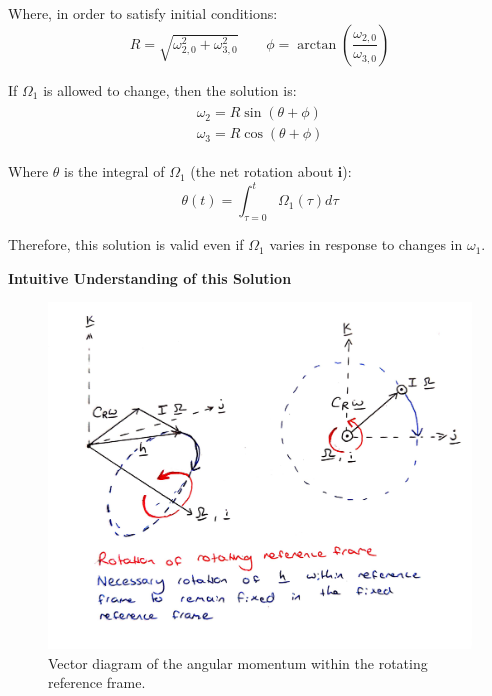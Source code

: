 \documentclass[12]{article}
\begin{document}
\begin{multicols*}{2}
Where, in order to satisfy initial conditions:
$$ R = \sqrt{\omega_{2,0}^2 + \omega_{3,0}^2} \quad\quad \phi = \arctan{\left(\frac{\omega_{2,0}}{\omega_{3,0}}\right)} $$

If $\Omega_1$ is allowed to change, then the solution is:
\begin{align} \label{eq:reaction_smart_solution2}
\begin{split}
\omega_2 = R\sin{(\theta + \phi)} \\
\omega_3 = R\cos{(\theta + \phi)}
\end{split}
\end{align}

Where $\theta$ is the integral of $\Omega_1$ (the net rotation about $\bm{i}$):
\begin{equation} \label{eq:reaction_smart_solution_theta}
\theta(t) = \int_{\tau=0}^t \Omega_1(\tau) d\tau
\end{equation}

Therefore, this solution is valid even if $\Omega_1$ varies in response to changes in $\omega_1$.

\vfill\null
\columnbreak

\textbf{Intuitive Understanding of this Solution}

\begin{figure}[H]
\centering
\includegraphics[width=\linewidth]{fig/vector_diagram1.jpg}
\vspace{-0.3cm}
\caption{\label{fig:vector_diagram1}Vector diagram of the angular momentum within the rotating reference frame.}
\end{figure}


\end{multicols*}
\end{document}
